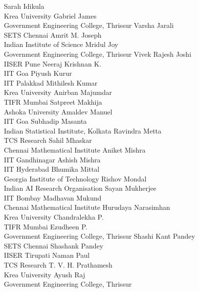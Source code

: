 \documentclass[a4paper,UKenglish]{dagrep-v2021}
\begin{document}
\begin{participants}
\participant Sarah Idikula\\ Krea University
\participant Gabriel James\\ Government Engineering College, Thrissur
\participant Varsha Jarali\\ SETS Chennai
\participant Amrit M. Joseph\\ Indian Institute of Science
\participant Mridul Joy\\ Government Engineering College, Thrissur
\participant Vivek Rajesh Joshi\\ IISER Pune
\participant Neeraj Krishnan K.\\ IIT Goa
\participant Piyush Kurur\\ IIT Palakkad
\participant Mithilesh Kumar\\ Krea University
\participant Anirban Majumdar\\ TIFR Mumbai
\participant Satpreet Makhija\\ Ashoka University
\participant Amaldev Manuel\\ IIT Goa
\participant Subhadip Masanta\\ Indian Statistical Institute, Kolkata
\participant Ravindra Metta\\ TCS Research
\participant Sahil Mhaskar\\ Chennai Mathematical Institute
\participant Aniket Mishra\\ IIT Gandhinagar
\participant Ashish Mishra\\ IIT Hyderabad
\participant Bhumika Mittal\\ Georgia Institute of Technology
\participant Rishov Mondal\\ Indian AI Research Organisation
\participant Sayan Mukherjee\\ IIT Bombay
\participant Madhavan Mukund\\ Chennai Mathematical Institute
\participant Hurudaya Narasimhan\\ Krea University
\participant Chandralekha P.\\ TIFR Mumbai
\participant Ezudheen P.\\ Government Engineering College, Thrissur
\participant Shashi Kant Pandey\\ SETS Chennai
\participant Shashank Pandey\\ IISER Tirupati
\participant Naman Paul\\ TCS Research
\participant T. V. H. Prathamesh\\ Krea University
\participant Ayush Raj\\ Government Engineering College, Thrissur

\end{participants}
\end{document}
